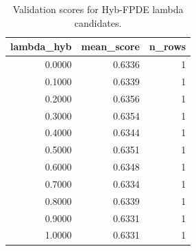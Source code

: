 \begin{table}[t]
\caption{Validation scores for Hyb-FPDE lambda candidates.}
\label{tab:lambda_distribution_computed}
\centering
\begin{tabular}{rrr}
\toprule
lambda\_hyb & mean\_score & n\_rows \\
\midrule
0.0000 & 0.6336 & 1 \\
0.1000 & 0.6339 & 1 \\
0.2000 & 0.6356 & 1 \\
0.3000 & 0.6354 & 1 \\
0.4000 & 0.6344 & 1 \\
0.5000 & 0.6351 & 1 \\
0.6000 & 0.6348 & 1 \\
0.7000 & 0.6334 & 1 \\
0.8000 & 0.6339 & 1 \\
0.9000 & 0.6331 & 1 \\
1.0000 & 0.6331 & 1 \\
\bottomrule
\end{tabular}

\end{table}
